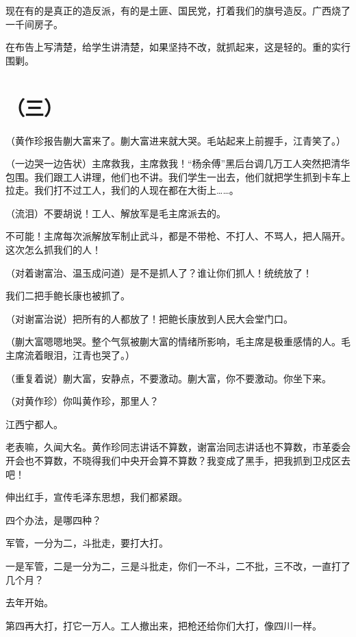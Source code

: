 现在有的是真正的造反派，有的是土匪、国民党，打着我们的旗号造反。广西烧了一千间房子。

在布告上写清楚，给学生讲清楚，如果坚持不改，就抓起来，这是轻的。重的实行围剿。

\section*{（三）}

（黄作珍报告蒯大富来了。蒯大富进来就大哭。毛站起来上前握手，江青笑了。）

（一边哭一边告状）主席救我，主席救我！“杨余傅”黑后台调几万工人突然把清华包围。我们跟工人讲理，他们也不讲。我们学生一出去，他们就把学生抓到卡车上拉走。我们打不过工人，我们的人现在都在大街上……。

（流泪）不要胡说！工人、解放军是毛主席派去的。

不可能！主席每次派解放军制止武斗，都是不带枪、不打人、不骂人，把人隔开。这次怎么抓我们的人！

（对着谢富治、温玉成问道）是不是抓人了？谁让你们抓人！统统放了！

我们二把手鲍长康也被抓了。

（对谢富治说）把所有的人都放了！把鲍长康放到人民大会堂门口。

（蒯大富嗯嗯地哭。整个气氛被蒯大富的情绪所影响，毛主席是极重感情的人。毛主席流着眼泪，江青也哭了。）

（重复着说）蒯大富，安静点，不要激动。蒯大富，你不要激动。你坐下来。

（对黄作珍）你叫黄作珍，那里人？

江西宁都人。

老表嘛，久闻大名。黄作珍同志讲话不算数，谢富治同志讲话也不算数，市革委会开会也不算数，不晓得我们中央开会算不算数？我变成了黑手，把我抓到卫戍区去吧！

伸出红手，宣传毛泽东思想，我们都紧跟。

四个办法，是哪四种？

军管，一分为二，斗批走，要打大打。

一是军管，二是一分为二，三是斗批走，你们一不斗，二不批，三不改，一直打了几个月？

去年开始。

第四再大打，打它一万人。工人撤出来，把枪还给你们大打，像四川一样。

